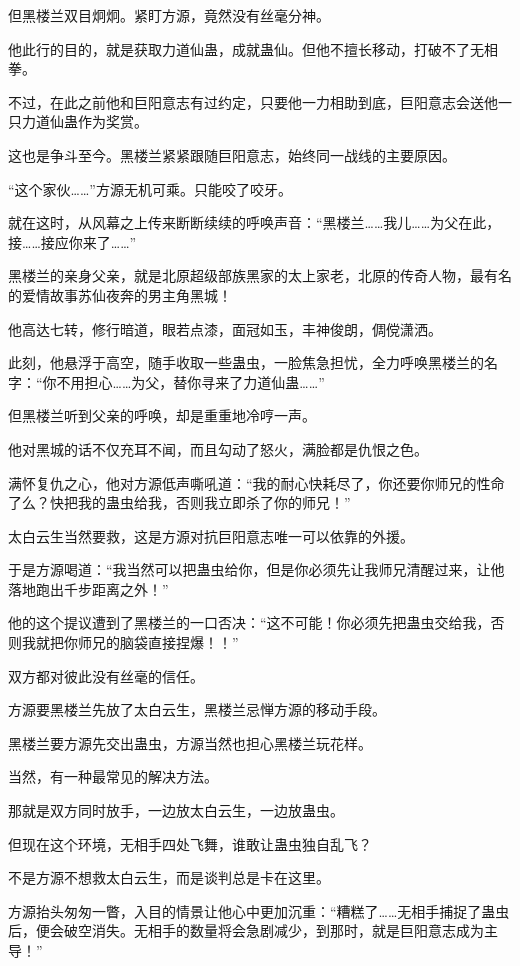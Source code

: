 \begin{this_body}
但黑楼兰双目炯炯。紧盯方源，竟然没有丝毫分神。

他此行的目的，就是获取力道仙蛊，成就蛊仙。但他不擅长移动，打破不了无相拳。

不过，在此之前他和巨阳意志有过约定，只要他一力相助到底，巨阳意志会送他一只力道仙蛊作为奖赏。

这也是争斗至今。黑楼兰紧紧跟随巨阳意志，始终同一战线的主要原因。

“这个家伙……”方源无机可乘。只能咬了咬牙。

就在这时，从风幕之上传来断断续续的呼唤声音：“黑楼兰……我儿……为父在此，接……接应你来了……”

黑楼兰的亲身父亲，就是北原超级部族黑家的太上家老，北原的传奇人物，最有名的爱情故事苏仙夜奔的男主角黑城！

他高达七转，修行暗道，眼若点漆，面冠如玉，丰神俊朗，倜傥潇洒。

此刻，他悬浮于高空，随手收取一些蛊虫，一脸焦急担忧，全力呼唤黑楼兰的名字：“你不用担心……为父，替你寻来了力道仙蛊……”

但黑楼兰听到父亲的呼唤，却是重重地冷哼一声。

他对黑城的话不仅充耳不闻，而且勾动了怒火，满脸都是仇恨之色。

满怀复仇之心，他对方源低声嘶吼道：“我的耐心快耗尽了，你还要你师兄的性命了么？快把我的蛊虫给我，否则我立即杀了你的师兄！”

太白云生当然要救，这是方源对抗巨阳意志唯一可以依靠的外援。

于是方源喝道：“我当然可以把蛊虫给你，但是你必须先让我师兄清醒过来，让他落地跑出千步距离之外！”

他的这个提议遭到了黑楼兰的一口否决：“这不可能！你必须先把蛊虫交给我，否则我就把你师兄的脑袋直接捏爆！！”

双方都对彼此没有丝毫的信任。

方源要黑楼兰先放了太白云生，黑楼兰忌惮方源的移动手段。

黑楼兰要方源先交出蛊虫，方源当然也担心黑楼兰玩花样。

当然，有一种最常见的解决方法。

那就是双方同时放手，一边放太白云生，一边放蛊虫。

但现在这个环境，无相手四处飞舞，谁敢让蛊虫独自乱飞？

不是方源不想救太白云生，而是谈判总是卡在这里。

方源抬头匆匆一瞥，入目的情景让他心中更加沉重：“糟糕了……无相手捕捉了蛊虫后，便会破空消失。无相手的数量将会急剧减少，到那时，就是巨阳意志成为主导！”


\end{this_body}
